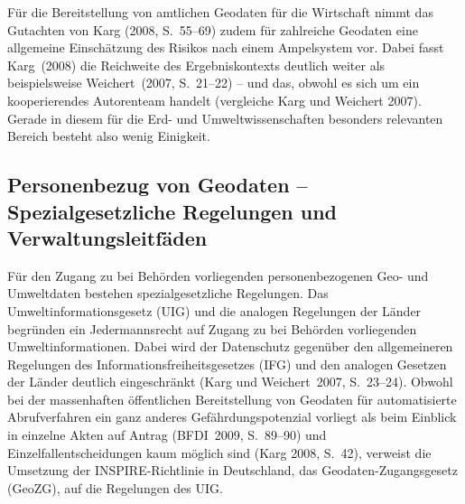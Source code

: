 \documentclass[a4paper,
fontsize=11pt,
oneside,
numbers=noperiodatend,
parskip=half-,
bibliography=totoc,
final
]{scrartcl}
\begin{document}
Für die Bereitstellung von amtlichen Geodaten für die Wirtschaft nimmt
das Gutachten von Karg (2008, S.~55--69) zudem für zahlreiche Geodaten
eine allgemeine Einschätzung des Risikos nach einem Ampelsystem vor.
Dabei fasst Karg~(2008) die Reichweite des Ergebniskontexts deutlich
weiter als beispielsweise Weichert~(2007, S.~21--22) -- und das, obwohl
es sich um ein kooperierendes Autorenteam handelt (vergleiche Karg und
Weichert 2007). Gerade in diesem für die Erd- und Umweltwissenschaften
besonders relevanten Bereich besteht also wenig Einigkeit.

\hypertarget{personenbezug-von-geodaten---spezialgesetzliche-regelungen-und-verwaltungsleitfuxe4den}{%
\subsection{Personenbezug von Geodaten -- Spezialgesetzliche Regelungen und Verwaltungsleitfäden}\label{personenbezug-von-geodaten---spezialgesetzliche-regelungen-und-verwaltungsleitfuxe4den}}

Für den Zugang zu bei Behörden vorliegenden personenbezogenen Geo- und
Umweltdaten bestehen spezialgesetzliche Regelungen. Das
Umweltinformationsgesetz (UIG) und die analogen Regelungen der Länder
begründen ein Jedermannsrecht auf Zugang zu bei Behörden vorliegenden
Umweltinformationen. Dabei wird der Datenschutz gegenüber den
allgemeineren Regelungen des Informationsfreiheitsgesetzes (IFG) und den
analogen Gesetzen der Länder deutlich eingeschränkt (Karg und
Weichert~2007, S.~23--24). Obwohl bei der massenhaften öffentlichen
Bereitstellung von Geodaten für automatisierte Abrufverfahren ein ganz
anderes Gefährdungspotenzial vorliegt als beim Einblick in einzelne
Akten auf Antrag (BFDI~2009, S.~89--90) und Einzelfallentscheidungen
kaum möglich sind (Karg 2008, S.~42), verweist die Umsetzung der
INSPIRE-Richtlinie in Deutschland, das Geodaten-Zugangsgesetz (GeoZG),
auf die Regelungen des UIG.
\end{document}

